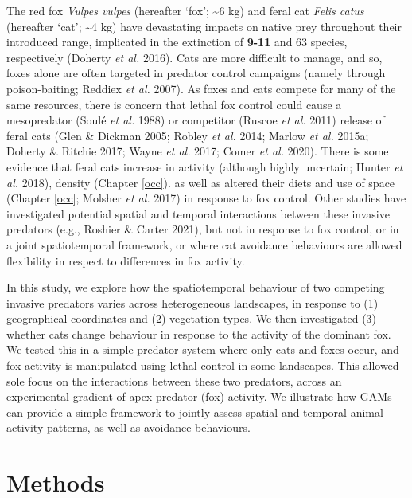 \documentclass[11pt,a4paper,titlepage,twoside,openright]{style/unimelbthesis}
\begin{document}
\begin{mainmatter}
The red fox \emph{Vulpes vulpes} (hereafter `fox'; \textasciitilde6 kg) and feral cat \emph{Felis catus} (hereafter `cat'; \textasciitilde4 kg) have devastating impacts on native prey throughout their introduced range, implicated in the extinction of \textbf{9-11} and 63 species, respectively (Doherty \emph{et al.} 2016). Cats are more difficult to manage, and so, foxes alone are often targeted in predator control campaigns (namely through poison-baiting; Reddiex \emph{et al.} 2007). As foxes and cats compete for many of the same resources, there is concern that lethal fox control could cause a mesopredator (Soulé \emph{et al.} 1988) or competitor (Ruscoe \emph{et al.} 2011) release of feral cats (Glen \& Dickman 2005; Robley \emph{et al.} 2014; Marlow \emph{et al.} 2015a; Doherty \& Ritchie 2017; Wayne \emph{et al.} 2017; Comer \emph{et al.} 2020). There is some evidence that feral cats increase in activity (although highly uncertain; Hunter \emph{et al.} 2018), density (Chapter \ref{occ}). as well as altered their diets and use of space (Chapter \ref{occ}; Molsher \emph{et al.} 2017) in response to fox control. Other studies have investigated potential spatial and temporal interactions between these invasive predators (e.g., Roshier \& Carter 2021), but not in response to fox control, or in a joint spatiotemporal framework, or where cat avoidance behaviours are allowed flexibility in respect to differences in fox activity.

In this study, we explore how the spatiotemporal behaviour of two competing invasive predators varies across heterogeneous landscapes, in response to (1) geographical coordinates and (2) vegetation types. We then investigated (3) whether cats change behaviour in response to the activity of the dominant fox. We tested this in a simple predator system where only cats and foxes occur, and fox activity is manipulated using lethal control in some landscapes. This allowed sole focus on the interactions between these two predators, across an experimental gradient of apex predator (fox) activity. We illustrate how GAMs can provide a simple framework to jointly assess spatial and temporal animal activity patterns, as well as avoidance behaviours.

\newpage

\hypertarget{methods-3}{%
\section{Methods}\label{methods-3}}

\hypertarget{study-area-and-camera-trapping-1}{%
}
\end{mainmatter}
\end{document}
